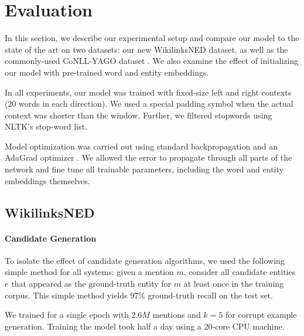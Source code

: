 \documentclass[11pt]{article}
\begin{document}
\section{Evaluation}
\label{experiments}

In this section, we describe our experimental setup and compare our model to the state of the art on two datasets: our new WikilinksNED dataset, as well as the commonly-used CoNLL-YAGO dataset \cite{hoffart2011robust}. We also examine the effect of initializing our model with pre-trained word and entity embeddings.

In all experiments, our model was trained with fixed-size left and right contexts (20 words in each direction). We used a special padding symbol when the actual context was shorter than the window. Further, we filtered stopwords using NLTK's stop-word list.

Model optimization was carried out using standard backpropagation and an AdaGrad optimizer \cite{duchi2011adaptive}. We allowed the error to propagate through all parts of the network and fine tune all trainable parameters, including the word and entity embeddings themselves.


\subsection{WikilinksNED}

\paragraph{Candidate Generation}
To isolate the effect of candidate generation algorithms, we used the following simple method for all systems: given a mention $m$, consider all candidate entities $e$ that appeared as the ground-truth entity for $m$ at least once in the training corpus. This simple method yields $97\%$ ground-truth recall on the test set.

We trained for a single  epoch with $2.6M$ mentions and $k=5$ for corrupt example generation. Training the model took half a day using a 20-core CPU machine.
\end{document}
